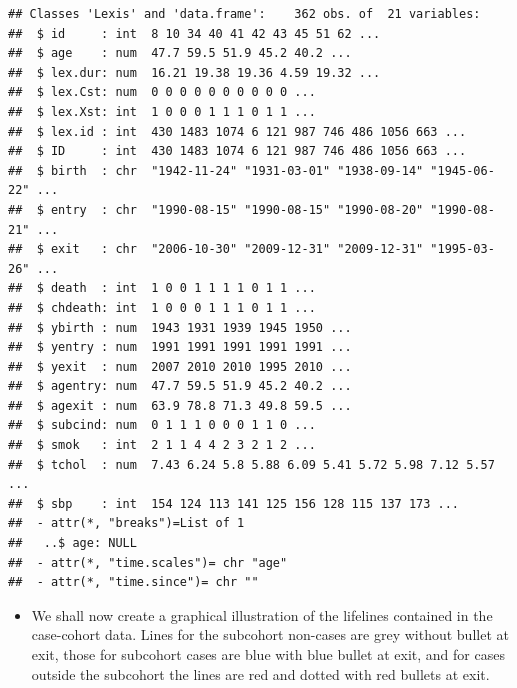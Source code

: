 \documentclass[
]{book}
\newenvironment{Shaded}{\begin{snugshade}}{\end{snugshade}}
\newcommand{\AttributeTok}[1]{\textcolor[rgb]{0.13,0.29,0.53}{#1}}
\newcommand{\DecValTok}[1]{\textcolor[rgb]{0.00,0.00,0.81}{#1}}
\newcommand{\FunctionTok}[1]{\textcolor[rgb]{0.13,0.29,0.53}{\textbf{#1}}}
\newcommand{\NormalTok}[1]{#1}
\newcommand{\SpecialCharTok}[1]{\textcolor[rgb]{0.81,0.36,0.00}{\textbf{#1}}}
\newcommand{\StringTok}[1]{\textcolor[rgb]{0.31,0.60,0.02}{#1}}
\providecommand{\tightlist}{%
  \setlength{\itemsep}{0pt}\setlength{\parskip}{0pt}}
\theoremstyle{definition}
\theoremstyle{definition}
\theoremstyle{definition}
\theoremstyle{definition}
\theoremstyle{remark}
\begin{document}
\begin{verbatim}
## Classes 'Lexis' and 'data.frame':    362 obs. of  21 variables:
##  $ id     : int  8 10 34 40 41 42 43 45 51 62 ...
##  $ age    : num  47.7 59.5 51.9 45.2 40.2 ...
##  $ lex.dur: num  16.21 19.38 19.36 4.59 19.32 ...
##  $ lex.Cst: num  0 0 0 0 0 0 0 0 0 0 ...
##  $ lex.Xst: int  1 0 0 0 1 1 1 0 1 1 ...
##  $ lex.id : int  430 1483 1074 6 121 987 746 486 1056 663 ...
##  $ ID     : int  430 1483 1074 6 121 987 746 486 1056 663 ...
##  $ birth  : chr  "1942-11-24" "1931-03-01" "1938-09-14" "1945-06-22" ...
##  $ entry  : chr  "1990-08-15" "1990-08-15" "1990-08-20" "1990-08-21" ...
##  $ exit   : chr  "2006-10-30" "2009-12-31" "2009-12-31" "1995-03-26" ...
##  $ death  : int  1 0 0 1 1 1 1 0 1 1 ...
##  $ chdeath: int  1 0 0 0 1 1 1 0 1 1 ...
##  $ ybirth : num  1943 1931 1939 1945 1950 ...
##  $ yentry : num  1991 1991 1991 1991 1991 ...
##  $ yexit  : num  2007 2010 2010 1995 2010 ...
##  $ agentry: num  47.7 59.5 51.9 45.2 40.2 ...
##  $ agexit : num  63.9 78.8 71.3 49.8 59.5 ...
##  $ subcind: num  0 1 1 1 0 0 0 1 1 0 ...
##  $ smok   : int  2 1 1 4 4 2 3 2 1 2 ...
##  $ tchol  : num  7.43 6.24 5.8 5.88 6.09 5.41 5.72 5.98 7.12 5.57 ...
##  $ sbp    : int  154 124 113 141 125 156 128 115 137 173 ...
##  - attr(*, "breaks")=List of 1
##   ..$ age: NULL
##  - attr(*, "time.scales")= chr "age"
##  - attr(*, "time.since")= chr ""
\end{verbatim}

\begin{itemize}
\tightlist
\item
  We shall now create a graphical illustration of
  the lifelines contained in the case-cohort data.
  Lines for the subcohort non-cases are grey without bullet at exit,
  those for subcohort cases are blue with blue bullet at exit, and
  for cases outside the subcohort the lines are red and dotted with
  red bullets at exit.
\end{itemize}

\begin{Shaded}
\end{Shaded}
\end{document}
